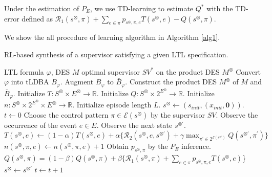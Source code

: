 \documentclass[a4j,12pt,oneside,openany,english,dvipdfmx]{jsbook}
\newcommand{\myspq}{\ensuremath{[\![s^{\otimes}]\!]}_q}
\begin{document}
Under the estimation of $P_E$, we use TD-learning to estimate $Q^{\ast}$ with the TD-error defined as $\mathcal{R}_1(s^{\otimes},\pi) + \sum_{e \in \pi} p_{s^{\otimes},\pi,e} T(s^{\otimes},e) - Q(s^{\otimes},\pi)$.

We show the all procedure of learning algorithm in Algorithm \ref{alg1}.

\begin{algorithm}
 \caption{RL-based synthesis of a supervisor satisfying a given LTL specification.}
 \begin{algorithmic}[1]
 \renewcommand{\algorithmicrequire}{\textbf{Input:}}
 \renewcommand{\algorithmicensure}{\textbf{Output:}}
 \REQUIRE LTL formula $\varphi$, DES $M$
 \ENSURE  optimal supervisor $SV^{\ast}$ on the product DES $M^{\otimes}$
  \STATE Convert $\varphi$ into tLDBA $B_{\varphi}$.
  \STATE Augment $B_{\varphi}$ to $\bar{B}_{\varphi}$.
  \STATE Construct the product DES $M^{\otimes}$ of $M$ and $\bar{B}_{\varphi}$.
  \STATE Initialize $T:S^{\otimes} \times E^{\otimes} \rightarrow \mathbb{R}$.
  \STATE Initialize $Q:S^{\otimes} \times 2^{E^{\otimes}} \rightarrow \mathbb{R}$.
  \STATE Initialize $n:S^{\otimes} \times 2^{E^{\otimes}} \times E^{\otimes} \rightarrow \mathbb{R}$.
  \STATE Initialize episode length $L$.
  \STATE $s^{\otimes} \leftarrow (s_{init},(x_{init},\bm{0}))$.
  \STATE $t \leftarrow 0$
  \WHILE {$t <L$ and $\myspq \notin SinkSet$ }
  \STATE Choose the control pattern $\pi \in \mathcal{E}(s^{\otimes})$ by the supervisor $SV$.
  \STATE Observe the occurrence of the event $e \in E$.
  \STATE Observe the next state $s^{\otimes \prime}$.
  \STATE $T(s^{\otimes},e) \leftarrow (1-\alpha)T(s^{\otimes},e) + \alpha \{ \mathcal{R}_2(s^{\otimes},e,s^{\otimes \prime}) + \gamma \max_{\pi^{\prime} \in 2^{\mathcal{E}(s^{\otimes \prime})}}Q(s^{\otimes \prime},\pi^{\prime}) \}$
  \STATE $n(s^{\otimes}, \pi, e) \leftarrow n(s^{\otimes}, \pi, e) + 1$
  \STATE Obtain $p_{s^{\otimes},\pi}$ by the $P_E$ inference.
  \STATE $Q(s^{\otimes},\pi) = (1-\beta)Q(s^{\otimes},\pi) + \beta \{\mathcal{R}_1(s^{\otimes},\pi) + \sum_{e \in \pi} p_{s^{\otimes},\pi,e} T(s^{\otimes},e)$\}
  \STATE $s^{\otimes} \leftarrow s^{\otimes \prime}$
  \STATE $t \leftarrow t + 1$
  \ENDWHILE
  \ENDWHILE
 \end{algorithmic}
 \label{alg1}
 \end{algorithm}
\end{document}
